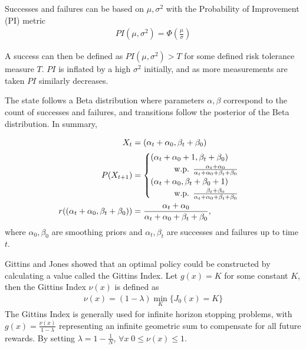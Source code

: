 Successes and failures can be based on $\mu, \sigma^2$ with the Probability of Improvement (PI) metric
\begin{align}
  PI(\mu, \sigma^2) = \Phi(\frac{\mu}{\sigma})
\end{align}

A success can then be defined as $PI(\mu, \sigma^2) > T$ for some defined risk tolerance measure $T$. $PI$ is inflated by a high $\sigma^2$ initially, and as more measurements are taken $PI$ similarly decreases. 

The state follows a Beta distribution where parameters $\alpha,\beta$ correspond to the count of successes and failures, and transitions follow the posterior of the Beta distribution. In summary,

\begin{align}
\begin{split}
  X_t &= (\alpha_t + \alpha_0, \beta_t + \beta_0) \\
  P(X_{t+1}) &=
  \begin{cases}
      (\alpha_t + \alpha_0 + 1, \beta_t + \beta_0)
      \\ \hspace*{1cm}\text{w.p. } \frac{\alpha_t + \alpha_0}{\alpha_t + \alpha_0 + \beta_t + \beta_0}\\
      (\alpha_t + \alpha_0, \beta_t + \beta_0 + 1)
      \\ \hspace*{1cm}\text{w.p. } \frac{\beta_t + \beta_0}{\alpha_t + \alpha_0 + \beta_t + \beta_0}
  \end{cases}\\
  r((\alpha_t + \alpha_0, \beta_t + \beta_0)) &= \frac{\alpha_t + \alpha_0}{\alpha_t + \alpha_0 + \beta_t + \beta_0},\\
\end{split}
\end{align}
where $\alpha_0,\beta_0$ are smoothing priors and $\alpha_t,\beta_t$ are successes and failures up to time $t$.

Gittins and Jones showed that an optimal policy could be constructed by calculating a value called the Gittins Index. Let $g(x) = K$ for some constant $K$, then the Gittins Index $\nu(x)$ is defined as
\begin{align}
  \nu(x) = (1-\lambda)\min_{K} \{J_0(x) = K\}
\end{align}
The Gittins Index is generally used for infinite horizon stopping problems, with $g(x)=\frac{\nu(x)}{1-\lambda}$ representing an infinite geometric sum to compensate for all future rewards. By setting $\lambda=1-\frac{1}{N}$, $\forall x \; 0 \leq \nu(x) \leq 1$.


